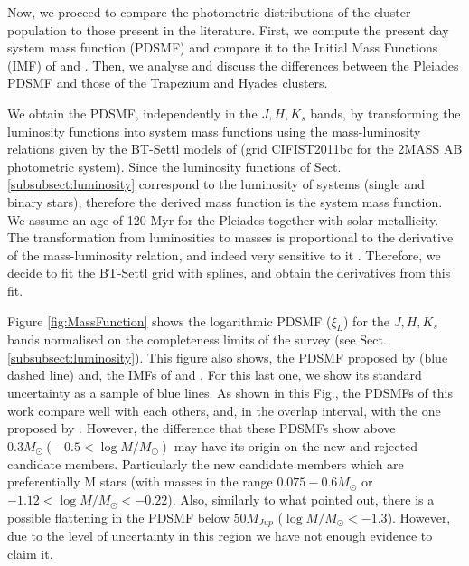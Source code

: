 Now, we proceed to compare the photometric distributions of the cluster population to those present in the literature. 
First, we compute the present day system mass function (PDSMF) and compare it to the Initial Mass Functions (IMF) of \citet{Chabrier2005} and \citet{Thies2007}. Then, we analyse and discuss the differences between the Pleiades PDSMF and those of the Trapezium and Hyades clusters. 

We obtain the PDSMF, independently in the $J,H,K_s$ bands, by transforming the luminosity functions into system mass functions using the mass-luminosity relations given by the BT-Settl models of \citet{Allard2012} (grid CIFIST2011bc for the 2MASS AB photometric system). Since the luminosity functions of Sect. \ref{subsubsect:luminosity} correspond to the luminosity of systems (single and binary stars), therefore the derived mass function is the system mass function. We assume an age of 120 Myr for the Pleiades together with solar metallicity. The transformation from luminosities to masses is proportional to the derivative of the mass-luminosity relation, and indeed very sensitive to it \cite[see][ for some words of caution]{DAntona1998}. Therefore, we decide to fit the BT-Settl grid with splines, and obtain the derivatives from this fit. 

Figure \ref{fig:MassFunction} shows the logarithmic PDSMF ($\xi_L$) for the $J,H,K_s$ bands normalised on the completeness limits of the survey (see Sect. \ref{subsubsect:luminosity}). This figure also shows, the PDSMF proposed by  \citet{Bouy2015} (blue dashed line) and, the IMFs of \citet{Thies2007} and \citet{Chabrier2005}. For this last one, we show its standard uncertainty \cite[taken from][]{Chabrier2003} as a sample of blue lines. As shown in this Fig., the PDSMFs of this work compare well with each others, and, in the overlap interval, with the one proposed by \citet{Bouy2015}. However, the difference that these PDSMFs show above $0.3 M_{\odot} (-0.5 < \log M/M_{\odot})$ may have its origin on the new and rejected candidate members. Particularly the new candidate members which are preferentially M stars (with masses in the range $0.075 - 0.6 M_{\odot}$ or $-1.12 < \log M/M_{\odot} < -0.22$). Also, similarly to what \citet{Bouy2015} pointed out, there is a possible flattening in the PDSMF below $50 M_{Jup}$ ($\log M/M_{\odot} < -1.3$). However, due to the level of uncertainty in this region we have not enough evidence to claim it.

